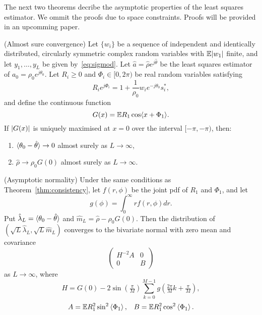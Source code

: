 \documentclass[conference]{IEEEtran}
\begin{document}
The next two theorems decribe the asymptotic properties of the least squares estimator.  We ommit the proofs due to space constraints.  Proofs will be provided in an upcomming paper.

\begin{theorem}\label{thm:consistency} (Almost sure convergence)
Let $\{w_i\}$ be a sequence of independent and identically distributed, circularly symmetric complex random variables with ${\mathbb E} {\left\vert w_1 \right\vert}$ finite, and let $y_1,\dots, y_L$ be given by~\eqref{eq:sigmod}.   Let $\hat{a} = \hat{\rho}e^{j\hat{\theta}}$ be the least squares estimator of $a_0 = \rho_0e^{j\theta_0}$.  Let $R_i \geq 0$ and $\Phi_i \in [0,2\pi)$ be real random variables satisfying
\begin{equation}\label{eq:RiandPhii}
R_ie^{j\Phi_i} = 1 + \frac{1}{\rho_0} w_i e^{-j\theta_0} s_i^*,
\end{equation}
and define the continuous function
\[
G(x) = {\mathbb E} R_1 \cos\langle  x + \Phi_1 \rangle.
\] 
If ${\left\vert G(x) \right\vert}$ is uniquely maximised at $x = 0$ over the interval $[-\pi,-\pi)$, then:
\begin{enumerate}
\item $\langle \theta_0 - \hat{\theta} \rangle \rightarrow 0$ almost surely as $L \rightarrow \infty$,
\item $\hat{\rho} \rightarrow \rho_0 G(0)$ almost surely as $L \rightarrow \infty$.
\end{enumerate}
\end{theorem}

\begin{theorem}\label{thm:normality} (Asymptotic normality)
Under the same conditions as Theorem~\ref{thm:consistency}, let $f(r,\phi)$ be the joint pdf of $R_1$ and $\Phi_1$, and let
\[
g(\phi) = \int_{0}^{\infty} r f(r,\phi) dr.
\]
Put $\hat{\lambda}_L = \langle \theta_0 - \hat{\theta} \rangle$ and $\hat{m}_L = \hat{\rho} - \rho_0 G(0)$. %
Then the distribution of $(\sqrt{L}\hat{\lambda}_L, \sqrt{L}\hat{m}_L)$ converges to the bivariate normal with zero mean and covariance
\[
\left( \begin{array}{cc} 
H^{-2} A & 0 \\
0 & B
\end{array} \right)
\]
as $L \rightarrow \infty$, where
\[
H = G(0) -  2 \sin(\tfrac{\pi}{M}) \sum_{k = 0}^{M-1} g(\tfrac{2\pi}{M}k + \tfrac{\pi}{M}),
\]
\[
A = {\mathbb E} R_1^2\sin^2\left\langle \Phi_1 \right\rangle, \;\;\; B = {\mathbb E} R_1^2 \cos^2\left\langle \Phi_1 \right\rangle. 
\]
\end{theorem}
\end{document}
